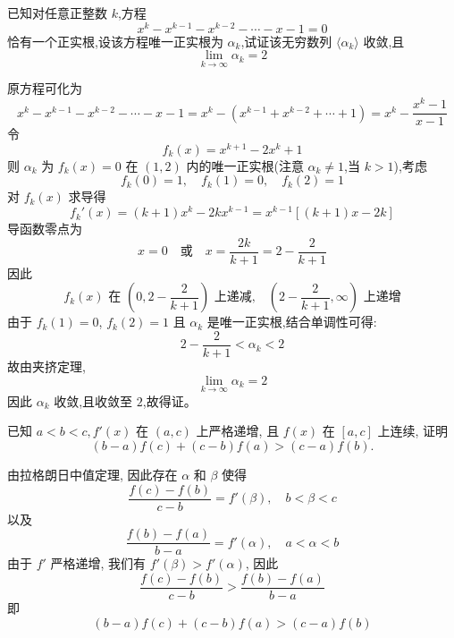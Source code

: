 \begin{questions}
    \question 已知对任意正整数 $k$,方程 
    \[
    x^{k}-x^{k-1}-x^{k-2}-\cdots-x-1=0
    \]
    恰有一个正实根,设该方程唯一正实根为 $\alpha_k$,试证该无穷数列 $\langle \alpha_k \rangle$ 收敛,且 $$\lim\limits_{k \to \infty} \alpha_k = 2$$
    \begin{solution}
        原方程可化为
        \[
        x^k - x^{k-1} - x^{k-2} - \cdots - x - 1 = x^k - (x^{k-1} + x^{k-2} + \cdots + 1)
        = x^k - \frac{x^k - 1}{x - 1}
        \]
        令
        \[
        f_k(x) = x^{k+1} - 2x^k + 1
        \]
        则 $\alpha_k$ 为 $f_k(x) = 0$ 在 $(1, 2)$ 内的唯一正实根(注意 $\alpha_k \ne 1$,当 $k > 1$),考虑
        \[
        f_k(0) = 1,\quad f_k(1) = 0,\quad f_k(2) = 1
        \]
        对 $f_k(x)$ 求导得
        \[
        f_k'(x) = (k+1)x^k - 2k x^{k-1} = x^{k-1}[(k+1)x - 2k]
        \]
        导函数零点为
        \[
        x = 0 \quad \text{或} \quad x = \frac{2k}{k+1} = 2 - \frac{2}{k+1}
        \]
        因此
        \[
        f_k(x) \text{ 在 } \left(0, 2 - \frac{2}{k+1} \right) \text{ 上递减,}
        \quad
        \left(2 - \frac{2}{k+1}, \infty\right) \text{ 上递增}
        \]
        由于 $f_k(1) = 0$, $f_k(2) = 1$ 且 $\alpha_k$ 是唯一正实根,结合单调性可得:
        \[
        2 - \frac{2}{k+1} < \alpha_k < 2
        \]
        故由夹挤定理,
        \[
        \lim_{k \to \infty} \alpha_k = 2
        \]
        因此 $\alpha_k$ 收敛,且收敛至 $2$,故得证。
    \end{solution}

    \question 已知 $a < b < c,f'(x)$ 在 $(a, c)$ 上严格递增, 且 $f(x)$ 在 $[a, c]$ 上连续, 证明
    \[
    (b-a) f(c) + (c-b) f(a) > (c-a) f(b).
    \]
    \begin{solution}
        由拉格朗日中值定理, 因此存在 $\alpha$ 和 $\beta$ 使得
        \[
        \frac{f(c)-f(b)}{c-b} = f'(\beta), \quad b < \beta < c
        \]
        以及
        \[
        \frac{f(b)-f(a)}{b-a} = f'(\alpha), \quad a < \alpha < b
        \]
        由于 $f'$ 严格递增, 我们有 $f'(\beta) > f'(\alpha)$, 因此
        \[
        \frac{f(c)-f(b)}{c-b} > \frac{f(b)-f(a)}{b-a}
        \]
        即
        \[
        (b-a) f(c) + (c-b) f(a) > (c-a) f(b)
        \]
    \end{solution}


\end{questions}
